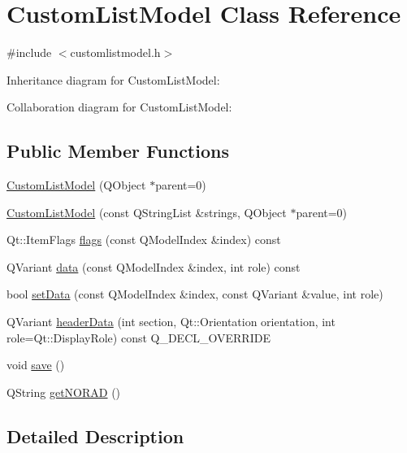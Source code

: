 \hypertarget{classCustomListModel}{}\section{Custom\+List\+Model Class Reference}
\label{classCustomListModel}


{\ttfamily \#include $<$customlistmodel.\+h$>$}



Inheritance diagram for Custom\+List\+Model\+:


Collaboration diagram for Custom\+List\+Model\+:
\subsection*{Public Member Functions}
\begin{DoxyCompactItemize}
\item 
\hyperlink{classCustomListModel_a6a9dfff471a701c3f34f005019f345f3}{Custom\+List\+Model} (Q\+Object $\ast$parent=0)
\item 
\hyperlink{classCustomListModel_aad529c6a4d9cac4a48b46c92b26930eb}{Custom\+List\+Model} (const Q\+String\+List \&strings, Q\+Object $\ast$parent=0)
\item 
Qt\+::\+Item\+Flags \hyperlink{classCustomListModel_aa134f39e9d4fbcba763d56dfd9b6a3f8}{flags} (const Q\+Model\+Index \&index) const
\item 
Q\+Variant \hyperlink{classCustomListModel_aeaf0b8e14950aa9e9c84fe955f5a19ec}{data} (const Q\+Model\+Index \&index, int role) const
\item 
bool \hyperlink{classCustomListModel_a73b3a21fae7ecd4119d82b5fd666ab90}{set\+Data} (const Q\+Model\+Index \&index, const Q\+Variant \&value, int role)
\item 
Q\+Variant \hyperlink{classCustomListModel_a45f33d5c10dccef9c24839279f70b127}{header\+Data} (int section, Qt\+::\+Orientation orientation, int role=Qt\+::\+Display\+Role) const Q\+\_\+\+D\+E\+C\+L\+\_\+\+O\+V\+E\+R\+R\+I\+DE
\item 
void \hyperlink{classCustomListModel_a6ff097740cb1ff5e352c808b0c3133ee}{save} ()
\item 
Q\+String \hyperlink{classCustomListModel_a4d68ff8203e26c21b7f2f6d8b82c8f22}{get\+N\+O\+R\+AD} ()
\end{DoxyCompactItemize}


\subsection{Detailed Description}



